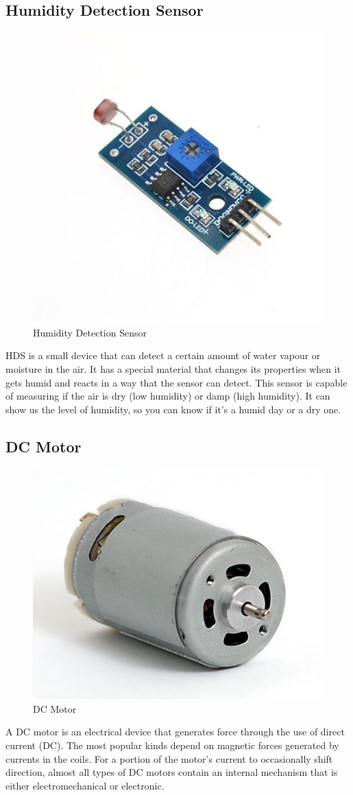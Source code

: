 \documentclass[conference]{IEEEtran}
\begin{document}
\subsection{Humidity Detection Sensor}
\begin{figure}
    \centering
    \includegraphics[width=0.5\linewidth]{Humidity Detection Sensor.png}
    \caption{Humidity Detection Sensor}
    \label{fig:enter-label}
\end{figure}
HDS is a small device that can detect a certain amount of water vapour or moisture in the air. It has a special material that changes its properties when it gets humid and reacts in a way that the sensor can detect. This sensor is capable of measuring if the air is dry (low humidity) or damp (high humidity). It can show us the level of humidity, so you can know if it's a humid day or a dry one.

\subsection{DC Motor}
\begin{figure}
     \centering
     \includegraphics[width=0.5\linewidth]{DC Motor.png}
     \caption{DC Motor}
     \label{fig:enter-label}
 \end{figure} 
A DC motor is an electrical device that generates force through the use of direct current (DC). The most popular kinds depend on magnetic forces generated by currents in the coils. For a portion of the motor's current to occasionally shift direction, almost all types of DC motors contain an internal mechanism that is either electromechanical or electronic.
\end{document}
